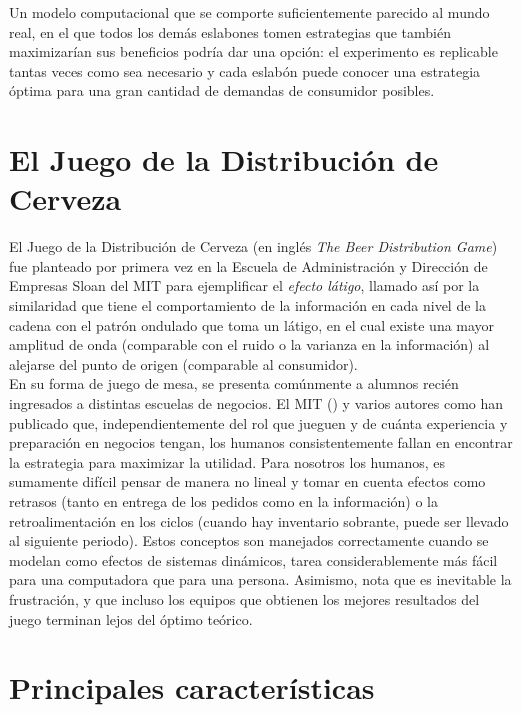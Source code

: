 Un modelo computacional que se comporte suficientemente parecido al mundo real, en el que todos los demás eslabones tomen estrategias que también maximizarían sus beneficios podría dar una opción: el experimento es replicable tantas veces como sea necesario y cada eslabón puede conocer una estrategia óptima para una gran cantidad de demandas de consumidor posibles.\\

\section{El Juego de la Distribuci\'on de Cerveza}

El Juego de la Distribuci\'on de Cerveza (en ingl\'es \textit{The Beer Distribution Game}) \cite{StermanArt} fue planteado por primera vez en la Escuela de Administraci\'on y Direcci\'on de Empresas Sloan del MIT para ejemplificar el \textit{efecto l\'atigo}, llamado as\'i por la similaridad que tiene el comportamiento de la informaci\'on en cada nivel de la cadena con el patr\'on ondulado que toma un l\'atigo, en el cual existe una mayor amplitud de onda (comparable con el ruido o la varianza en la informaci\'on) al alejarse del punto de origen (comparable al consumidor). \\

En su forma de juego de mesa, se presenta com\'unmente a alumnos reci\'en ingresados a distintas escuelas de negocios. El MIT (\citet{Dizikes}) y varios autores como \citet{Sterman} han publicado que, independientemente del rol que jueguen y de cu\'anta experiencia y preparaci\'on en negocios tengan, los humanos consistentemente fallan en encontrar la estrategia para maximizar la utilidad. Para nosotros los humanos, es sumamente dif\'icil pensar de manera no lineal y tomar en cuenta efectos como retrasos (tanto en entrega de los pedidos como en la informaci\'on) o la retroalimentaci\'on en los ciclos (cuando hay inventario sobrante, puede ser llevado al siguiente periodo). Estos conceptos son manejados correctamente cuando se modelan como efectos de sistemas din\'amicos, tarea considerablemente m\'as f\'acil para una computadora que para una persona. Asimismo, nota que es inevitable la frustraci\'on, y que incluso los equipos que obtienen los mejores resultados del juego terminan lejos del \'optimo te\'orico.\\

\section{Principales caracter\'isticas}

